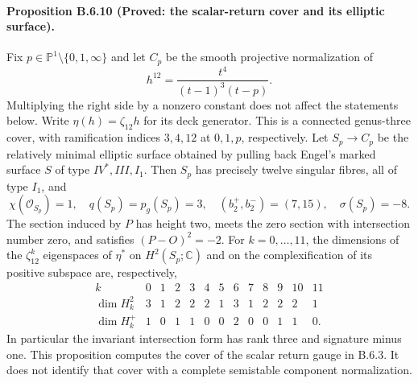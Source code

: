 \paragraph{Proposition B.6.10 (Proved: the scalar-return cover and its elliptic surface).}
Fix $p\in\mathbb P^1\setminus\{0,1,\infty\}$ and let $C_p$ be
the smooth projective normalization of
\[
 h^{12}=\frac{t^4}{(t-1)^3(t-p)}.
 \tag{B.C1}
\]
Multiplying the right side by a nonzero constant does not affect
the statements below.  Write $\eta(h)=\zeta_{12}h$ for its deck
generator.  This is a connected genus-three cover, with
ramification indices $3,4,12$ at $0,1,p$, respectively.
Let $S_p\to C_p$ be the relatively minimal elliptic surface obtained
by pulling back Engel's marked surface $S$ of type $IV^*,III,I_1$.
Then $S_p$ has precisely twelve singular fibres, all of type $I_1$,
and
\[
 \chi(\mathcal O_{S_p})=1,\quad q(S_p)=p_g(S_p)=3,\quad
 (b_2^+,b_2^-)=(7,15),\quad \sigma(S_p)=-8.
 \tag{B.C2}
\]
The section induced by $P$ has height two, meets the zero section
with intersection number zero, and satisfies $(P-O)^2=-2$.
For $k=0,\ldots,11$, the dimensions of the $\zeta_{12}^k$
eigenspaces of $\eta^*$ on $H^2(S_p;\mathbb C)$ and on the
complexification of its positive subspace are, respectively,
\[
 \begin{array}{c|rrrrrrrrrrrr}
 k&0&1&2&3&4&5&6&7&8&9&10&11\\\hline
 \dim H^2_k&3&1&2&2&2&1&3&1&2&2&2&1\\
 \dim H^+_k&1&0&1&1&0&0&2&0&0&1&1&0 .
 \end{array}
 \tag{B.C3}
\]
In particular the invariant intersection form has rank three
and signature minus one.  This proposition computes the cover
of the scalar return gauge in B.6.3.  It does not identify that
cover with a complete semistable component normalization.

